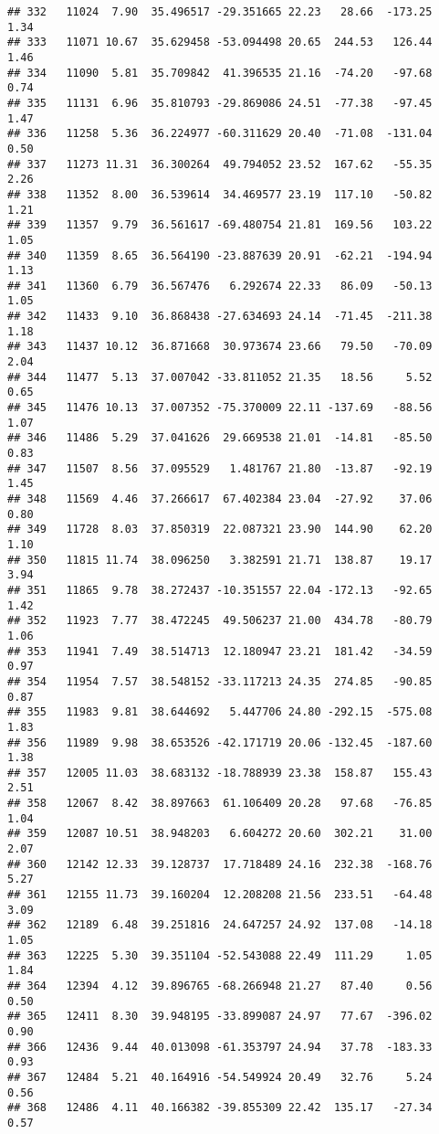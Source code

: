 \documentclass[]{article}
\begin{document}
\begin{verbatim}
## 332   11024  7.90  35.496517 -29.351665 22.23   28.66  -173.25  1.34
## 333   11071 10.67  35.629458 -53.094498 20.65  244.53   126.44  1.46
## 334   11090  5.81  35.709842  41.396535 21.16  -74.20   -97.68  0.74
## 335   11131  6.96  35.810793 -29.869086 24.51  -77.38   -97.45  1.47
## 336   11258  5.36  36.224977 -60.311629 20.40  -71.08  -131.04  0.50
## 337   11273 11.31  36.300264  49.794052 23.52  167.62   -55.35  2.26
## 338   11352  8.00  36.539614  34.469577 23.19  117.10   -50.82  1.21
## 339   11357  9.79  36.561617 -69.480754 21.81  169.56   103.22  1.05
## 340   11359  8.65  36.564190 -23.887639 20.91  -62.21  -194.94  1.13
## 341   11360  6.79  36.567476   6.292674 22.33   86.09   -50.13  1.05
## 342   11433  9.10  36.868438 -27.634693 24.14  -71.45  -211.38  1.18
## 343   11437 10.12  36.871668  30.973674 23.66   79.50   -70.09  2.04
## 344   11477  5.13  37.007042 -33.811052 21.35   18.56     5.52  0.65
## 345   11476 10.13  37.007352 -75.370009 22.11 -137.69   -88.56  1.07
## 346   11486  5.29  37.041626  29.669538 21.01  -14.81   -85.50  0.83
## 347   11507  8.56  37.095529   1.481767 21.80  -13.87   -92.19  1.45
## 348   11569  4.46  37.266617  67.402384 23.04  -27.92    37.06  0.80
## 349   11728  8.03  37.850319  22.087321 23.90  144.90    62.20  1.10
## 350   11815 11.74  38.096250   3.382591 21.71  138.87    19.17  3.94
## 351   11865  9.78  38.272437 -10.351557 22.04 -172.13   -92.65  1.42
## 352   11923  7.77  38.472245  49.506237 21.00  434.78   -80.79  1.06
## 353   11941  7.49  38.514713  12.180947 23.21  181.42   -34.59  0.97
## 354   11954  7.57  38.548152 -33.117213 24.35  274.85   -90.85  0.87
## 355   11983  9.81  38.644692   5.447706 24.80 -292.15  -575.08  1.83
## 356   11989  9.98  38.653526 -42.171719 20.06 -132.45  -187.60  1.38
## 357   12005 11.03  38.683132 -18.788939 23.38  158.87   155.43  2.51
## 358   12067  8.42  38.897663  61.106409 20.28   97.68   -76.85  1.04
## 359   12087 10.51  38.948203   6.604272 20.60  302.21    31.00  2.07
## 360   12142 12.33  39.128737  17.718489 24.16  232.38  -168.76  5.27
## 361   12155 11.73  39.160204  12.208208 21.56  233.51   -64.48  3.09
## 362   12189  6.48  39.251816  24.647257 24.92  137.08   -14.18  1.05
## 363   12225  5.30  39.351104 -52.543088 22.49  111.29     1.05  1.84
## 364   12394  4.12  39.896765 -68.266948 21.27   87.40     0.56  0.50
## 365   12411  8.30  39.948195 -33.899087 24.97   77.67  -396.02  0.90
## 366   12436  9.44  40.013098 -61.353797 24.94   37.78  -183.33  0.93
## 367   12484  5.21  40.164916 -54.549924 20.49   32.76     5.24  0.56
## 368   12486  4.11  40.166382 -39.855309 22.42  135.17   -27.34  0.57

\end{verbatim}
\end{document}
